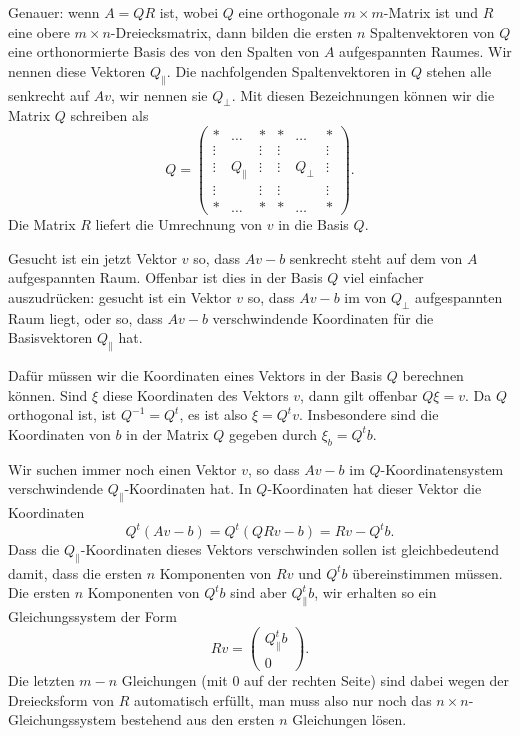 Genauer: wenn $A=QR$ ist, wobei $Q$ eine orthogonale $m\times m$-Matrix
ist und $R$ eine obere $m\times n$-Dreiecksmatrix, dann bilden die
ersten $n$ Spaltenvektoren von $Q$ eine orthonormierte Basis des
von den Spalten von $A$ aufgespannten Raumes.
Wir nennen diese Vektoren
$Q_{\|}$.
Die nachfolgenden Spaltenvektoren
in $Q$ stehen alle senkrecht auf $Av$, wir nennen sie $Q_{\perp}$.
Mit diesen Bezeichnungen können wir die Matrix $Q$ schreiben als
\[
Q=\begin{pmatrix}
*     &\dots &     *&      *&\dots   &*     \\
\vdots&      &\vdots&\vdots &        &\vdots\\
\vdots&Q_{\|}&\vdots&\vdots&Q_{\perp}&\vdots\\
\vdots&      &\vdots&\vdots &        &\vdots\\
*     &\dots &     *&      *&\dots   &*     
\end{pmatrix}.
\]
Die Matrix $R$ liefert die Umrechnung von $v$ in die Basis $Q$.

Gesucht ist ein jetzt Vektor $v$ so, dass
$Av-b$ senkrecht steht auf dem von $A$ aufgespannten Raum.
Offenbar ist dies in der Basis $Q$ viel einfacher auszudrücken:
gesucht ist ein Vektor $v$ so, dass $Av-b$ im von $Q_{\perp}$
aufgespannten Raum liegt, oder so, dass $Av-b$ verschwindende Koordinaten
für die Basisvektoren $Q_{\|}$ hat.

Dafür müssen wir die Koordinaten eines Vektors in der Basis $Q$
berechnen können.
Sind $\xi$ diese Koordinaten des Vektors $v$,
dann gilt offenbar $Q\xi = v$.
Da $Q$ orthogonal ist, ist $Q^{-1}=Q^t$, es ist also $\xi=Q^tv$.
Insbesondere sind die Koordinaten von $b$ in der
Matrix $Q$ gegeben durch $\xi_b=Q^tb$.

Wir suchen immer noch einen Vektor $v$, so dass $Av-b$ im $Q$-Koordinatensystem
verschwindende $Q_{\|}$-Koordinaten hat.
In $Q$-Koordinaten hat dieser
Vektor die Koordinaten
\[
Q^t(Av-b)=Q^t(QRv-b)=Rv-Q^tb.
\]
Dass die $Q_{\|}$-Koordinaten dieses Vektors verschwinden sollen ist
gleichbedeutend damit, dass die ersten $n$ Komponenten von 
$Rv$ und $Q^tb$ übereinstimmen müssen.
Die ersten $n$ Komponenten
von $Q^tb$ sind aber $Q_{\|}^tb$, wir erhalten so ein Gleichungssystem
der Form
\begin{equation}
Rv=\begin{pmatrix}
Q_{\|}^tb\\
0
\end{pmatrix}.
\label{qr-leastsquares}
\end{equation}
Die letzten $m-n$ Gleichungen (mit $0$ auf der rechten Seite) sind dabei
wegen der Dreiecksform von $R$ automatisch erfüllt, man muss also nur
noch das $n\times n$-Gleichungssystem bestehend aus den ersten $n$
Gleichungen lösen.

